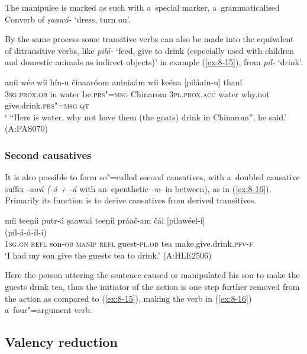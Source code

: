 The manipulee is marked as such with a~special marker, a~grammaticalised Converb of \textit{ṣaawá-} `dress, turn on'. 


By the same process some transitive verbs can also be made into the equivalent of ditransitive verbs, like \textit{pilá-} `feed, give to drink (especially used with children and domestic animals as indirect objects)' in example (\ref{ex:8-15}), from \textit{pil-} `drink'. 

\begin{exe}
\ex
\label{ex:8-15}
\gll aníi wée wíi hín-u činaaróom aniniaám wíi keéna [piláain-u] thaní  \\
\textsc{3sg.prox.ob} in water be.\textsc{prs"=msg} Chinarom \textsc{3pl.prox.acc} water why.not give.drink.\textsc{prs"=msg} \textsc{qt} \\
\glt ` ``Here is water, why not have them (the goats) drink in Chinarom'', he said.' (A:PAS070)
\end{exe}

\subsubsection*{Second causatives}

It is also possible to form so"=called second causatives, with a~doubled causative suffix \textit{-awá (-á + -á} with an~epenthetic \textit{-w-} in between), as in (\ref{ex:8-16}). Primarily its function is to derive causatives from derived transitives.

\begin{exe}
\ex
\label{ex:8-16}
\glll míi teeṇíi putr-á ṣaawaá teeṇíi práač-am čái
     [pilawéel-i]  \\
	{} {} {} {} {} {} {}  (pil-á-á-íl-i) \\
\textsc{1sg.gn} \textsc{refl} son-\textsc{ob} \textsc{manip} \textsc{refl} guest-\textsc{pl.ob} tea make.give.drink.\textsc{pfv-f} \\
\glt `I had my son give the guests tea to drink.' (A:HLE2506)
\end{exe}

Here the person uttering the sentence caused or manipulated his son to make the guests drink tea, thus the initiator of the action is one step further removed from the action as compared to (\ref{ex:8-15}), making the verb in (\ref{ex:8-16}) a~four"=argument verb. 


\subsection{Valency reduction}
\label{subsec:8-5-2}

